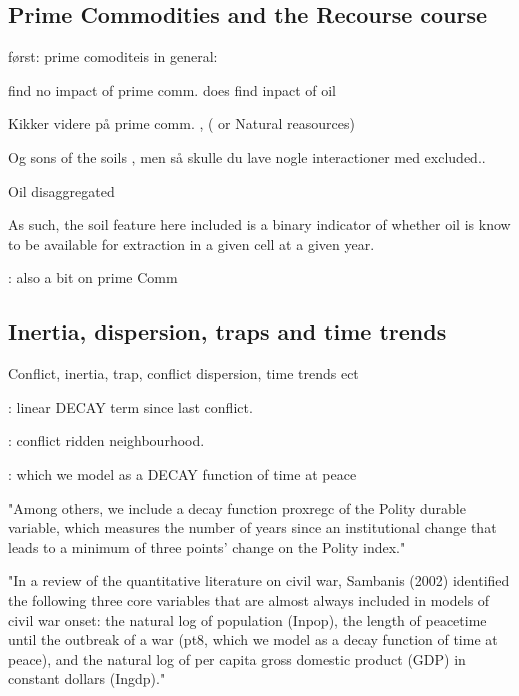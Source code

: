 \documentclass[a4paper]{article}
\begin{document}
\subsection{Prime Commodities and the Recourse course} %

først: prime comoditeis in general:
\cite{Collier_Hoeffler_1998, Collier_Hoeffler_2004}

find no impact of prime comm. \cite[76]{Fearon_Laitin_2003} does find inpact of oil \cite[84-86]{Fearon_Laitin_2003}


Kikker videre på prime comm. \cite{Fearon_2005}, ( or Natural reasources) \cite{Ross_2004}

Og sons of the soils \cite{Fearon_2004}, men så skulle du lave nogle interactioner med excluded..

\cite{Buhaug_2010} Oil disaggregated

As such, the soil feature here included is a binary indicator of whether oil is know to be available for extraction in a given cell at a given year. %

\cite{Hegre_Oestby_Raleigh_2009} : also a bit on prime Comm




\subsection{Inertia, dispersion, traps and time trends} %


Conflict, inertia, trap, conflict dispersion, time trends ect

\cite{Collier_Hoeffler_2004} : linear DECAY term since last conflict.

\cite{Goldstone_2010} : conflict ridden neighbourhood.

\cite{Hegre_Sambanis_2006} : which we model as a DECAY function of time at peace

"Among others, we include a decay function proxregc of the Polity
durable variable, which measures the number of years since an institutional change
that leads to a minimum of three points' change on the Polity index."

"In a review of the quantitative literature on civil war, Sambanis
(2002) identified the following three core variables that are almost always included
in models of civil war onset: the natural log of population (Inpop), the length of
peacetime until the outbreak of a war (pt8, which we model as a decay function of
time at peace), and the natural log of per capita gross domestic product (GDP) in
constant dollars (Ingdp)."
\end{document}
